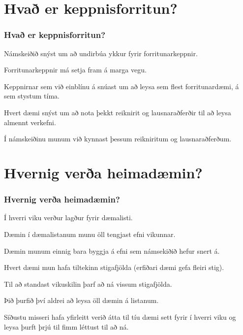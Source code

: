 \section{Hvað er keppnisforritun?}
{
    \frametitle{Hvað er keppnisforritun?}
    {
        \item<1-> Námskeiðið snýst um að undirbúa ykkur fyrir forritunarkeppnir.
        \item<2-> Forritunarkeppnir má setja fram á marga vegu.
        \item<3-> Keppnirnar sem við einblínu á snúast um að leysa sem flest forritunardæmi, á sem stystum tíma.
        \item<4-> Hvert dæmi snýst um að nota þekkt reiknirit og lausnaraðferðir til að leysa almennt verkefni.
        \item<5-> Í námskeiðinu munum við kynnast þessum reikniritum og lausnaraðferðum.
    }
}

\section{Hvernig verða heimadæmin?}
{
    \frametitle{Hvernig verða heimadæmin?}
    {
        \item<1-> Í hverri viku verður lagður fyrir dæmalisti.
        \item<2-> Dæmin í dæmalistanum munu öll tengjast efni vikunnar.
        \item<3-> Dæmin munum einnig bara byggja á efni sem námsekiðið hefur snert á.
        \item<4-> Hvert dæmi mun hafa tiltekinn stigafjölda (erfiðari dæmi gefa fleiri stig).
        \item<5-> Til að standast vikuskilin þarf að ná vissum stigafjölda.
        \item<6-> Þið þurfið því aldrei að leysa öll dæmin á listanum.
        \item<7-> Síðustu misseri hafa yfirleitt verið átta til tíu dæmi sett fyrir í hverri viku og leysa þurft þrjú til fimm léttust til að ná.
    }
}

